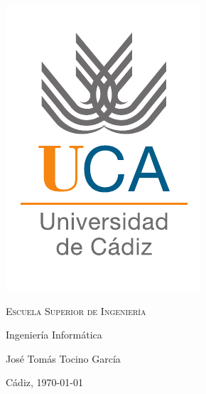\begin{titlepage}
  \centering
  \includegraphics[width=.3\textwidth]{0_misc/logo_uca}

  \bigskip
  \bigskip
  \bigskip

  \begin{changemargin}{2em}{2em}
    \centering

    {\Huge \textsc{\nohyphens{Escuela Superior de Ingeniería}}}

    \bigskip
    \bigskip
    \bigskip

    {\huge \nohyphens{Ingeniería Informática}}

    \bigskip
    \bigskip
    \bigskip
    \bigskip
    \bigskip
    \bigskip

    \begin{doublespace}
      {\LARGE \nohyphens{\nombreProyecto}}
    \end{doublespace}


    \bigskip
    \bigskip
    \bigskip
    \bigskip

    \bigskip
    \bigskip
    \bigskip
    \bigskip
    \bigskip
    \bigskip
    \bigskip

  \end{changemargin}

  {\Large José Tomás Tocino García \\}

  \bigskip

  {\large Cádiz, \today}

\end{titlepage}


